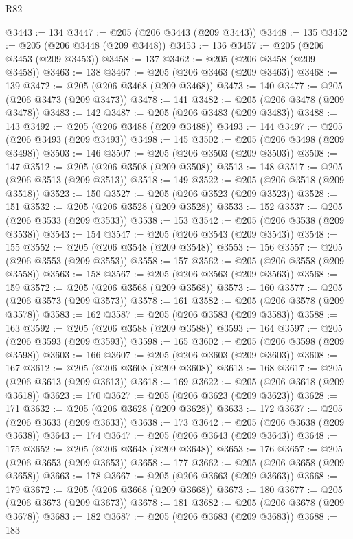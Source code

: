 \begin{lexlean}{R82}
\begin{coremodule}
@3443 := 134
@3447 := @205 (@206 @3443 (@209 @3443))
@3448 := 135
@3452 := @205 (@206 @3448 (@209 @3448))
@3453 := 136
@3457 := @205 (@206 @3453 (@209 @3453))
@3458 := 137
@3462 := @205 (@206 @3458 (@209 @3458))
@3463 := 138
@3467 := @205 (@206 @3463 (@209 @3463))
@3468 := 139
@3472 := @205 (@206 @3468 (@209 @3468))
@3473 := 140
@3477 := @205 (@206 @3473 (@209 @3473))
@3478 := 141
@3482 := @205 (@206 @3478 (@209 @3478))
@3483 := 142
@3487 := @205 (@206 @3483 (@209 @3483))
@3488 := 143
@3492 := @205 (@206 @3488 (@209 @3488))
@3493 := 144
@3497 := @205 (@206 @3493 (@209 @3493))
@3498 := 145
@3502 := @205 (@206 @3498 (@209 @3498))
@3503 := 146
@3507 := @205 (@206 @3503 (@209 @3503))
@3508 := 147
@3512 := @205 (@206 @3508 (@209 @3508))
@3513 := 148
@3517 := @205 (@206 @3513 (@209 @3513))
@3518 := 149
@3522 := @205 (@206 @3518 (@209 @3518))
@3523 := 150
@3527 := @205 (@206 @3523 (@209 @3523))
@3528 := 151
@3532 := @205 (@206 @3528 (@209 @3528))
@3533 := 152
@3537 := @205 (@206 @3533 (@209 @3533))
@3538 := 153
@3542 := @205 (@206 @3538 (@209 @3538))
@3543 := 154
@3547 := @205 (@206 @3543 (@209 @3543))
@3548 := 155
@3552 := @205 (@206 @3548 (@209 @3548))
@3553 := 156
@3557 := @205 (@206 @3553 (@209 @3553))
@3558 := 157
@3562 := @205 (@206 @3558 (@209 @3558))
@3563 := 158
@3567 := @205 (@206 @3563 (@209 @3563))
@3568 := 159
@3572 := @205 (@206 @3568 (@209 @3568))
@3573 := 160
@3577 := @205 (@206 @3573 (@209 @3573))
@3578 := 161
@3582 := @205 (@206 @3578 (@209 @3578))
@3583 := 162
@3587 := @205 (@206 @3583 (@209 @3583))
@3588 := 163
@3592 := @205 (@206 @3588 (@209 @3588))
@3593 := 164
@3597 := @205 (@206 @3593 (@209 @3593))
@3598 := 165
@3602 := @205 (@206 @3598 (@209 @3598))
@3603 := 166
@3607 := @205 (@206 @3603 (@209 @3603))
@3608 := 167
@3612 := @205 (@206 @3608 (@209 @3608))
@3613 := 168
@3617 := @205 (@206 @3613 (@209 @3613))
@3618 := 169
@3622 := @205 (@206 @3618 (@209 @3618))
@3623 := 170
@3627 := @205 (@206 @3623 (@209 @3623))
@3628 := 171
@3632 := @205 (@206 @3628 (@209 @3628))
@3633 := 172
@3637 := @205 (@206 @3633 (@209 @3633))
@3638 := 173
@3642 := @205 (@206 @3638 (@209 @3638))
@3643 := 174
@3647 := @205 (@206 @3643 (@209 @3643))
@3648 := 175
@3652 := @205 (@206 @3648 (@209 @3648))
@3653 := 176
@3657 := @205 (@206 @3653 (@209 @3653))
@3658 := 177
@3662 := @205 (@206 @3658 (@209 @3658))
@3663 := 178
@3667 := @205 (@206 @3663 (@209 @3663))
@3668 := 179
@3672 := @205 (@206 @3668 (@209 @3668))
@3673 := 180
@3677 := @205 (@206 @3673 (@209 @3673))
@3678 := 181
@3682 := @205 (@206 @3678 (@209 @3678))
@3683 := 182
@3687 := @205 (@206 @3683 (@209 @3683))
@3688 := 183

\end{coremodule}
\end{lexlean}
